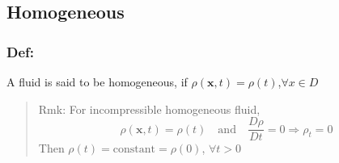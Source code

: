 \subsection{Homogeneous} %

\subsubsection{Def:} %

A fluid is said to be homogeneous, if $\rho (\textbf{x},t) = \rho(t)$,$\forall x\in D$

\begin{quote}
	Rmk:
For incompressible homogeneous fluid,
\begin{equation}
\rho(\textbf{x},t) = \rho(t)\quad\text{and}\quad \frac{D\rho}{Dt} = 0\Rightarrow \rho_t = 0
\end{equation}
Then $\rho(t) = \text{constant} = \rho(0)$, $\forall t>0$
\end{quote}


